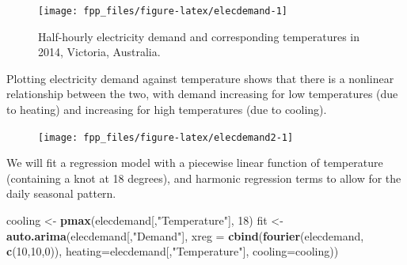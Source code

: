 \documentclass[]{book}
\newenvironment{Shaded}{\begin{snugshade}}{\end{snugshade}}
\newcommand{\DataTypeTok}[1]{\textcolor[rgb]{0.13,0.29,0.53}{#1}}
\newcommand{\DecValTok}[1]{\textcolor[rgb]{0.00,0.00,0.81}{#1}}
\newcommand{\KeywordTok}[1]{\textcolor[rgb]{0.13,0.29,0.53}{\textbf{#1}}}
\newcommand{\NormalTok}[1]{#1}
\newcommand{\OperatorTok}[1]{\textcolor[rgb]{0.81,0.36,0.00}{\textbf{#1}}}
\newcommand{\StringTok}[1]{\textcolor[rgb]{0.31,0.60,0.02}{#1}}
\begin{document}
\begin{figure}

{\centering \texttt{[image: fpp\_files/figure-latex/elecdemand-1]} 

}

\caption{Half-hourly electricity demand and corresponding temperatures in 2014, Victoria, Australia.}\label{fig:elecdemand}
\end{figure}

Plotting electricity demand against temperature shows that there is a nonlinear relationship between the two, with demand increasing for low temperatures (due to heating) and increasing for high temperatures (due to cooling).

\begin{Shaded}
\end{Shaded}

\begin{figure}

{\centering \texttt{[image: fpp\_files/figure-latex/elecdemand2-1]} 

}

\end{figure}

We will fit a regression model with a piecewise linear function of temperature (containing a knot at 18 degrees), and harmonic regression terms to allow for the daily seasonal pattern.

\begin{Shaded}
\begin{Highlighting}[]
\NormalTok{cooling <-}\StringTok{ }\KeywordTok{pmax}\NormalTok{(elecdemand[,}\StringTok{"Temperature"}\NormalTok{], }\DecValTok{18}\NormalTok{)}
\NormalTok{fit <-}\StringTok{ }\KeywordTok{auto.arima}\NormalTok{(elecdemand[,}\StringTok{"Demand"}\NormalTok{],}
         \DataTypeTok{xreg =} \KeywordTok{cbind}\NormalTok{(}\KeywordTok{fourier}\NormalTok{(elecdemand, }\KeywordTok{c}\NormalTok{(}\DecValTok{10}\NormalTok{,}\DecValTok{10}\NormalTok{,}\DecValTok{0}\NormalTok{)),}
               \DataTypeTok{heating=}\NormalTok{elecdemand[,}\StringTok{"Temperature"}\NormalTok{],}
               \DataTypeTok{cooling=}\NormalTok{cooling))}
\end{Highlighting}
\end{Shaded}
\end{document}

